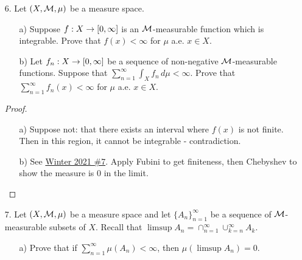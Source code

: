 \begin{itemize}
\begin{itemize}
    \item[b)] Prove that there exists a sequence of sets $\{U_n\}_{n\in\bbn}$ which are all open and dense in $\bbr$ whose intersection $\cap_{n=1}^\infty U_n$ has Lebesgue measure zero.
\end{itemize}
 
\begin{proof}
See \hyperref[q:w21-5]{Winter 2021 \#5}. Baire Category Theorem!
\end{proof}







\item[6.] Let $(X,\mathcal{M},\mu)$ be a measure space.
\begin{itemize}
    \item[a)] Suppose $f:X\rightarrow[0,\infty]$ is an $\mathcal{M}$-measurable function which is integrable. Prove that $f(x)<\infty$ for $\mu$ a.e. $x\in X$.
    
    \item[b)] Let $f_n:X\rightarrow[0,\infty]$ be a sequence of non-negative $\mathcal{M}$-measurable functions. Suppose that $\sum_{n=1}^\infty \int_X f_n \, d\mu < \infty.$ Prove that $\sum_{n=1}^\infty f_n(x) < \infty$ for $\mu$ a.e. $x \in X$.
\end{itemize}
 
\begin{proof}
\begin{itemize}
    \item[a)] Suppose not: that there exists an interval where $f(x)$ is not finite. Then in this region, it cannot be integrable - contradiction.
    
    \item[b)] See \hyperref[q:w21-7]{Winter 2021 \#7}. Apply Fubini to get finiteness, then Chebyshev to show the measure is $0$ in the limit.
\end{itemize}
\end{proof}






\item[7.] Let $(X,\mathcal{M},\mu)$ be a measure space and let $\{A_n\}_{n=1}^\infty$ be a sequence of $\mathcal{M}$-measurable subsets of $X$. Recall that $\limsup{A_n} = \cap_{n=1}^\infty \cup_{k=n}^\infty A_k$.
\begin{itemize}
    \item[a)] Prove that if $\sum_{n=1}^\infty \mu(A_n) < \infty$, then $\mu(\limsup{A_n}) = 0$.
    

\end{itemize}
\end{itemize}

